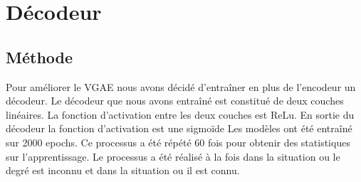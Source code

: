 \documentclass{article}
\begin{document}
\begin{table}[H]
    \captionsetup{justification=centering}
    \caption{Résultats de l'utilisation du dropout. \\ \footnotesize Dans chaque case est indiquée la moyenne et l'écart-type au format : moyenne(écart-type)}
    \label{tab:dropout}
\end{table}


\section{Décodeur}
\subsection{Méthode}
Pour améliorer le VGAE nous avons décidé d’entraîner en plus de l'encodeur un décodeur. 
Le décodeur que nous avons entraîné est constitué de deux couches linéaires.
La fonction d'activation entre les deux couches est ReLu.
En sortie du décodeur la fonction d'activation est une sigmoïde
Les modèles ont été entraîné sur 2000 epochs. 
Ce processus a été répété 60 fois pour obtenir des statistiques sur l'apprentissage.
Le processus a été réalisé à la fois dans la situation ou le degré est inconnu et dans la situation ou il est connu.
\end{document}

